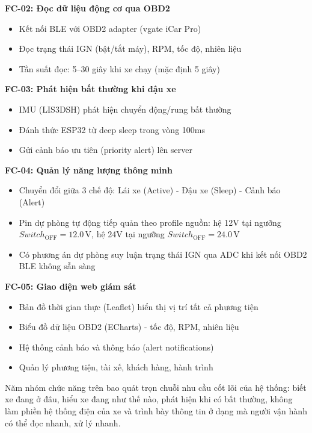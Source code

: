 \documentclass[a4paper]{extarticle}
\providecommand{\tightlist}{%
  \setlength{\itemsep}{0pt}\setlength{\parskip}{0pt}}
\begin{document}
\textbf{FC-02: Đọc dữ liệu động cơ qua OBD2}

\begin{itemize}
\tightlist
\item
  Kết nối BLE với OBD2 adapter (vgate iCar Pro)
\item
  Đọc trạng thái IGN (bật/tắt máy), RPM, tốc độ, nhiên liệu
\item
  Tần suất đọc: 5--30 giây khi xe chạy (mặc định 5 giây)
\end{itemize}

\textbf{FC-03: Phát hiện bất thường khi đậu xe}

\begin{itemize}
\tightlist
\item
  IMU (LIS3DSH) phát hiện chuyển động/rung bất thường
\item
  Đánh thức ESP32 từ deep sleep trong vòng 100ms
\item
  Gửi cảnh báo ưu tiên (priority alert) lên server
\end{itemize}

\textbf{FC-04: Quản lý năng lượng thông minh}

\begin{itemize}
\tightlist
\item
  Chuyển đổi giữa 3 chế độ: Lái xe (Active) - Đậu xe (Sleep) - Cảnh báo
  (Alert)
\item
  Pin dự phòng tự động tiếp quản theo profile nguồn: hệ 12V tại ngưỡng
  \(Switch_{\mathrm{OFF}} = 12.0\,\mathrm{V}\), hệ 24V tại ngưỡng
  \(Switch_{\mathrm{OFF}} = 24.0\,\mathrm{V}\)
\item
  Có phương án dự phòng suy luận trạng thái IGN qua ADC khi kết nối OBD2
  BLE không sẵn sàng
\end{itemize}

\textbf{FC-05: Giao diện web giám sát}

\begin{itemize}
\tightlist
\item
  Bản đồ thời gian thực (Leaflet) hiển thị vị trí tất cả phương tiện
\item
  Biểu đồ dữ liệu OBD2 (ECharts) - tốc độ, RPM, nhiên liệu
\item
  Hệ thống cảnh báo và thông báo (alert notifications)
\item
  Quản lý phương tiện, tài xế, khách hàng, hành trình
\end{itemize}

Năm nhóm chức năng trên bao quát trọn chuỗi nhu cầu cốt lõi của hệ
thống: biết xe đang ở đâu, hiểu xe đang như thế nào, phát hiện khi có
bất thường, không làm phiền hệ thống điện của xe và trình bày thông tin ở
dạng mà người vận hành có thể đọc nhanh, xử lý nhanh.
\end{document}
